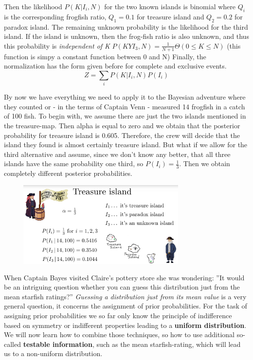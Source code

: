 \documentclass[12pt, a4paper]{scrartcl}
\begin{document}
Then the likelihood $P(K|I_i,N)$ for the two known islands is binomial
where $Q_i$ is the corresponding frogﬁsh ratio,
$Q_1 = 0.1$ for treasure island and $Q_2 = 0.2$ for paradox island.
The remaining unknown probability is the likelihood for the third island.
If the island is unknown, then the frog-ﬁsh ratio is also unknown, and thus
this probability is \textit{independent of K} $P(KYI_3,N)=\frac{1}{N+1}\Theta(0\leq K\leq N)$ (this function is simpy a constant function between 0 and N)
Finally, the normalization has the form given before for complete and exclusive events.\[Z=\sum_iP(K|I_i,N)P(I_i)\]

By now we have everything we need to apply it to the Bayesian adventure
where they counted or - in the terms of Captain Venn - measured 14 frogﬁsh
in a catch of 100 ﬁsh.
To begin with, we assume there are just the two islands mentioned in the
treasure-map. Then alpha is equal to zero and we obtain that the posterior probability for
treasure island is 0.605. Therefore, the crew will decide that the island 
they found is almost certainly treasure island.
But what if we allow for the third alternative and assume, since we don’t
know any better, that all three islands have the same probability one third, so $P(I_i)=\frac 13$.
Then we obtain completely diﬀerent posterior probabilities.\\%
 \begin{figure}[H]
	\centering
	\includegraphics[width=0.75\textwidth]{6_2.png}
\end{figure}


When Captain Bayes visited Claire’s pottery store she was wondering:
”It would be an intriguing question whether you can guess
this distribution just from the mean starﬁsh ratings?”
\textit{Guessing a distribution just from its mean value} is a very general question, it
concerns the assignment of prior probabilities. For the task of assigning
prior probabilities we so far only know the principle of indiﬀerence based on
symmetry or indiﬀerent properties leading to a \textbf{uniform distribution}.
We will now learn how to combine those techniques, so how to use additional
so-called \textbf{testable information}, such as the mean starﬁsh-rating, which will
lead us to a non-uniform distribution.\\
\end{document}
